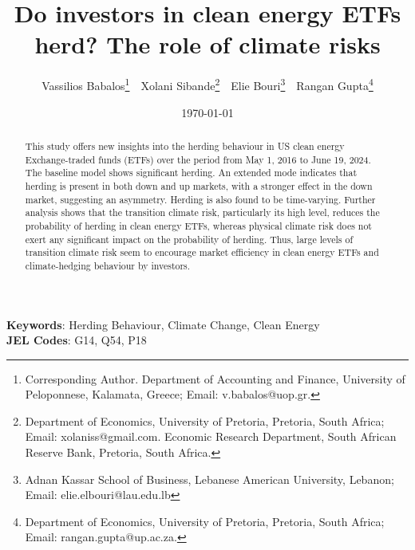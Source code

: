 \title{Do investors in clean energy ETFs herd? The role of climate risks}



\author{ 
Vassilios Babalos\footnote{Corresponding Author. Department of Accounting and Finance, University of Peloponnese, Kalamata,  Greece; Email: v.babalos@uop.gr.} \,\,
Xolani Sibande\footnote{Department of Economics, University of Pretoria, Pretoria, South Africa; Email: xolaniss@gmail.com. Economic Research Department, South African Reserve Bank, Pretoria, South Africa.} \,\, 
Elie Bouri\footnote{Adnan Kassar School of Business, Lebanese American University, Lebanon; Email: elie.elbouri@lau.edu.lb} \,\,
Rangan Gupta\footnote{Department of Economics, University of Pretoria, Pretoria, South Africa; Email: rangan.gupta@up.ac.za.} 
}
\date{\today}
\maketitle

\begin{abstract}

This study offers new insights into the herding behaviour in US clean energy Exchange-traded funds (ETFs) over the period from May 1, 2016 to June 19, 2024. 
The baseline model shows significant herding. An extended mode indicates that herding is present in both down and up markets, with a stronger effect in the down market, suggesting an asymmetry. 
Herding is also found to be time-varying. Further analysis shows that the transition climate risk, particularly its high level, reduces the probability of herding in clean energy ETFs, whereas physical climate risk does not exert any significant impact on the probability of herding. 
Thus, large levels of transition climate risk seem to encourage market efficiency in clean energy ETFs  and climate-hedging behaviour by investors.

\end{abstract}

\noindent\textbf{Keywords}: Herding Behaviour, Climate Change, Clean Energy
\\
\textbf{JEL Codes}: G14, Q54, P18
\newpage